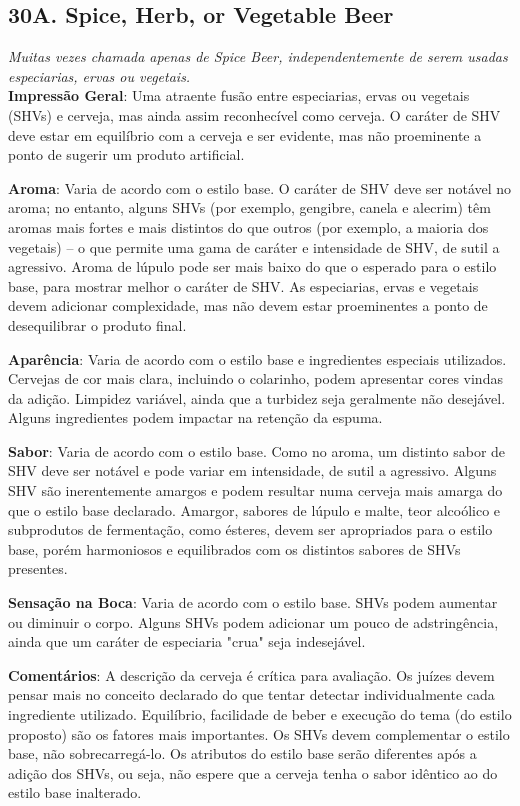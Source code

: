 \subsection*{30A. Spice, Herb, or Vegetable Beer}
\textit{Muitas vezes chamada apenas de Spice Beer, independentemente de serem usadas especiarias, ervas ou vegetais.}\\
\textbf{Impressão Geral}: Uma atraente fusão entre especiarias, ervas ou vegetais (SHVs) e cerveja, mas ainda assim reconhecível como cerveja. O caráter de SHV deve estar em equilíbrio com a cerveja e ser evidente, mas não proeminente a ponto de sugerir um produto artificial.

\textbf{Aroma}: Varia de acordo com o estilo base. O caráter de SHV deve ser notável no aroma; no entanto, alguns SHVs (por exemplo, gengibre, canela e alecrim) têm aromas mais fortes e mais distintos do que outros (por exemplo, a maioria dos vegetais) – o que permite uma gama de caráter e intensidade de SHV, de sutil a agressivo. Aroma de lúpulo pode ser mais baixo do que o esperado para o estilo base, para mostrar melhor o caráter de SHV. As especiarias, ervas e vegetais devem adicionar complexidade, mas não devem estar proeminentes a ponto de desequilibrar o produto final.

\textbf{Aparência}: Varia de acordo com o estilo base e ingredientes especiais utilizados. Cervejas de cor mais clara, incluindo o colarinho, podem apresentar cores vindas da adição. Limpidez variável, ainda que a turbidez seja geralmente não desejável. Alguns ingredientes podem impactar na retenção da espuma.

\textbf{Sabor}: Varia de acordo com o estilo base. Como no aroma, um distinto sabor de SHV deve ser notável e pode variar em intensidade, de sutil a agressivo. Alguns SHV são inerentemente amargos e podem resultar numa cerveja mais amarga do que o estilo base declarado. Amargor, sabores de lúpulo e malte, teor alcoólico e subprodutos de fermentação, como ésteres, devem ser apropriados para o estilo base, porém harmoniosos e equilibrados com os distintos sabores de SHVs presentes.

\textbf{Sensação na Boca}: Varia de acordo com o estilo base. SHVs podem aumentar ou diminuir o corpo. Alguns SHVs podem adicionar um pouco de adstringência, ainda que um caráter de especiaria "crua" seja indesejável.

\textbf{Comentários}: A descrição da cerveja é crítica para avaliação. Os juízes devem pensar mais no conceito declarado do que tentar detectar individualmente cada ingrediente utilizado. Equilíbrio, facilidade de beber e execução do tema (do estilo proposto) são os fatores mais importantes. Os SHVs devem complementar o estilo base, não sobrecarregá-lo. Os atributos do estilo base serão diferentes após a adição dos SHVs, ou seja, não espere que a cerveja tenha o sabor idêntico ao do estilo base inalterado.

